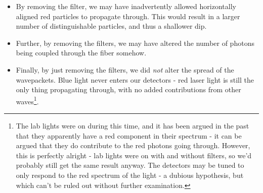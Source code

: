 \documentclass[10pt,a4paper]{article}
\begin{document}
\begin{itemize}
\item By removing the filter, we may have inadvertently allowed horizontally aligned red particles to propagate through. This would result in a larger number of distinguishable particles, and thus a shallower dip.
\item Further, by removing the filters, we may have altered the number of photons being coupled through the fiber somehow.
\item Finally, by just removing the filters, we did \textit{not} alter the spread of the wavepackets. Blue light never enters our detectors - red laser light is still the only thing propagating through, with no added contributions from other waves\footnote{The lab lights were on during this time, and it has been argued in the past that they apparently have a red component in their spectrum - it can be argued that they do contribute to the red photons going through. However, this is perfectly alright - lab lights were on with and without filters, so we'd probably still get the same result anyway. The detectors may be tuned to only respond to the red spectrum of the light - a dubious hypothesis, but which can't be ruled out without further examination.}.
\end{itemize}
\end{document}

